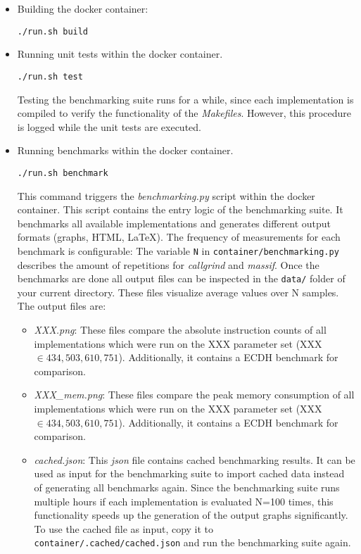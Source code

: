 \begin{itemize}
\itemsep0em 
\item Building the docker container:
\begin{lstlisting}[numbers=none,linewidth=4cm]
./run.sh build
\end{lstlisting}

\item Running unit tests within the docker container.
\begin{lstlisting}[numbers=none,linewidth=4cm]
./run.sh test
\end{lstlisting}
Testing the benchmarking suite runs for a while, since each implementation is compiled to verify the functionality of the \textit{Makefiles}. However, this procedure is logged while the unit tests are executed.

\item Running benchmarks within the docker container.
\begin{lstlisting}[numbers=none,linewidth=4cm]
./run.sh benchmark
\end{lstlisting}
This command triggers the \textit{benchmarking.py} script within the docker container. This script contains the entry logic of the benchmarking suite. It benchmarks all available implementations and generates different output formats (graphs, \gls{HTML}, LaTeX). The frequency of measurements for each benchmark is configurable: The variable \texttt{N} in \texttt{container/benchmarking.py} describes the amount of repetitions for \textit{callgrind} and \textit{massif}. Once the benchmarks are done all output files can be inspected in the  \texttt{data/} folder of your current directory. These files visualize average values over N samples. The output files are:
	\begin{itemize}
	\item \textit{XXX.png}: These files compare the absolute instruction counts of all implementations which were run on the XXX parameter set (XXX $\in {434, 503, 610, 751}$). Additionally, it contains a \gls{ECDH} benchmark for comparison.
	\item \textit{XXX\_mem.png}: These files compare the peak memory consumption of all implementations which were run on the XXX parameter set (XXX $\in {434, 503, 610, 751}$). Additionally, it contains a \gls{ECDH} benchmark for comparison.

	\item \textit{cached.json}: This \textit{json} file contains cached benchmarking results. It can be used as input for the benchmarking suite to import cached data instead of generating all benchmarks again. Since the benchmarking suite runs multiple hours if each implementation is evaluated N=100 times, this functionality speeds up the generation of the output graphs significantly. To use the cached file as input, copy it to \texttt{container/.cached/cached.json} and run the benchmarking suite again.
	

\end{itemize}
\end{itemize}
